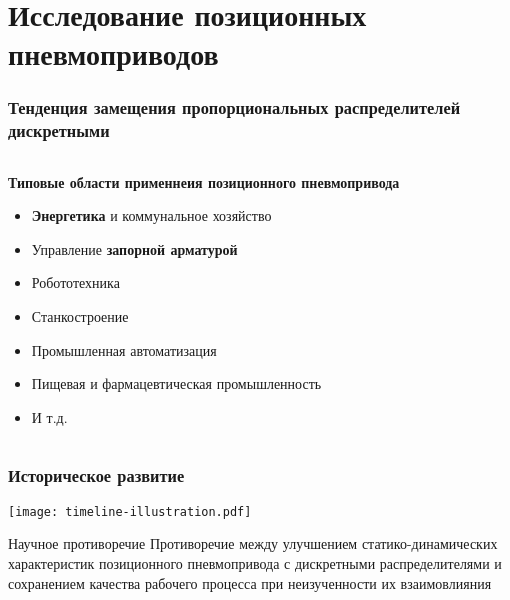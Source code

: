 \begin{frame}
	\setcounter{framenumber}{1}
	\maketitle
\end{frame}

\section{Исследование позиционных пневмоприводов}

\begin{frame}\frametitle{Тенденция замещения пропорциональных распределителей дискретными}
	\begin{columns}[T]
		\vspace*{-7pt}

		\begin{block}{\scriptsize \textbf{Типовые области применнеия позиционного пневмопривода}}
			\centering
			\begin{itemize}
				\item \scriptsize \textbf{Энергетика} и коммунальное хозяйство
				\item \scriptsize Управление \textbf{запорной арматурой}
				\item \scriptsize Робототехника
				\item \scriptsize Станкостроение
				\item \scriptsize Промышленная автоматизация
				\item \scriptsize Пищевая и фармацевтическая промышленность
				\item \scriptsize И т.д.
			\end{itemize}
		\end{block}
	\end{columns}
\end{frame}

\begin{frame}
	\frametitle{Историческое развитие}
	\texttt{[image: timeline-illustration.pdf]}
	\begin{block}{Научное противоречие}
		\scriptsize Противоречие между улучшением статико-динамических характеристик позиционного пневмопривода с дискретными распределителями и сохранением качества рабочего процесса при неизученности их взаимовлияния
	\end{block}
\end{frame}

